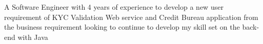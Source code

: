 


\begin{cvparagraph}


    A Software Engineer with 4 years of experience to develop a new user requirement of KYC Validation Web service and Credit Bureau application from the business requirement looking to continue to develop my skill set on the back-end with Java

\end{cvparagraph}
